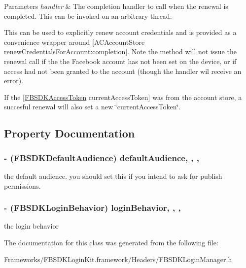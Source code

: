 \begin{DoxyParams}{Parameters}
{\em handler} & The completion handler to call when the renewal is completed. This can be invoked on an arbitrary thread.\\
\hline
\end{DoxyParams}
This can be used to explicitly renew account credentials and is provided as a convenience wrapper around {\ttfamily \mbox{[}A\+C\+Account\+Store renew\+Credentials\+For\+Account\+:completion\mbox{]}}. Note the method will not issue the renewal call if the the Facebook account has not been set on the device, or if access had not been granted to the account (though the handler wil receive an error).

If the {\ttfamily \mbox{[}\hyperlink{interface_f_b_s_d_k_access_token}{F\+B\+S\+D\+K\+Access\+Token} current\+Access\+Token\mbox{]}} was from the account store, a succesful renewal will also set a new \char`\"{}current\+Access\+Token\char`\"{}. 

\subsection{Property Documentation}
\hypertarget{interface_f_b_s_d_k_login_manager_a4f662c89be174bb577acf75f95aefbc0}{}
\subsubsection[{default\+Audience}]{\setlength{\rightskip}{0pt plus 5cm}-\/ (F\+B\+S\+D\+K\+Default\+Audience) default\+Audience\hspace{0.3cm}{\ttfamily [read]}, {\ttfamily [write]}, {\ttfamily [nonatomic]}, {\ttfamily [assign]}}\label{interface_f_b_s_d_k_login_manager_a4f662c89be174bb577acf75f95aefbc0}
the default audience.  you should set this if you intend to ask for publish permissions. \hypertarget{interface_f_b_s_d_k_login_manager_a6380b50840262848d8fd3e224de9f520}{}
\subsubsection[{login\+Behavior}]{\setlength{\rightskip}{0pt plus 5cm}-\/ (F\+B\+S\+D\+K\+Login\+Behavior) login\+Behavior\hspace{0.3cm}{\ttfamily [read]}, {\ttfamily [write]}, {\ttfamily [nonatomic]}, {\ttfamily [assign]}}\label{interface_f_b_s_d_k_login_manager_a6380b50840262848d8fd3e224de9f520}
the login behavior 

The documentation for this class was generated from the following file\+:\begin{DoxyCompactItemize}
\item 
Frameworks/\+F\+B\+S\+D\+K\+Login\+Kit.\+framework/\+Headers/F\+B\+S\+D\+K\+Login\+Manager.\+h\end{DoxyCompactItemize}
